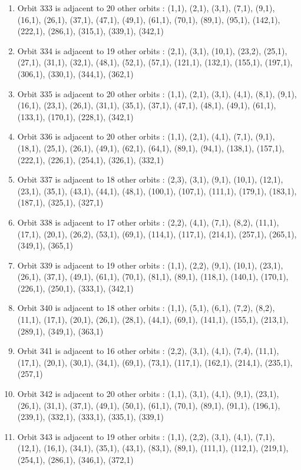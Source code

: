 \documentclass[12pt]{article}
\begin{document}
\begin{enumerate}
\item Orbit 333 is adjacent to 20 other orbits : (1,1), (2,1), (3,1), (7,1), (9,1), (16,1), (26,1), (37,1), (47,1), (49,1), (61,1), (70,1), (89,1), (95,1), (142,1), (222,1), (286,1), (315,1), (339,1), (342,1)
\item Orbit 334 is adjacent to 19 other orbits : (2,1), (3,1), (10,1), (23,2), (25,1), (27,1), (31,1), (32,1), (48,1), (52,1), (57,1), (121,1), (132,1), (155,1), (197,1), (306,1), (330,1), (344,1), (362,1)
\item Orbit 335 is adjacent to 20 other orbits : (1,1), (2,1), (3,1), (4,1), (8,1), (9,1), (16,1), (23,1), (26,1), (31,1), (35,1), (37,1), (47,1), (48,1), (49,1), (61,1), (133,1), (170,1), (228,1), (342,1)
\item Orbit 336 is adjacent to 20 other orbits : (1,1), (2,1), (4,1), (7,1), (9,1), (18,1), (25,1), (26,1), (49,1), (62,1), (64,1), (89,1), (94,1), (138,1), (157,1), (222,1), (226,1), (254,1), (326,1), (332,1)
\item Orbit 337 is adjacent to 18 other orbits : (2,3), (3,1), (9,1), (10,1), (12,1), (23,1), (35,1), (43,1), (44,1), (48,1), (100,1), (107,1), (111,1), (179,1), (183,1), (187,1), (325,1), (327,1)
\item Orbit 338 is adjacent to 17 other orbits : (2,2), (4,1), (7,1), (8,2), (11,1), (17,1), (20,1), (26,2), (53,1), (69,1), (114,1), (117,1), (214,1), (257,1), (265,1), (349,1), (365,1)
\item Orbit 339 is adjacent to 19 other orbits : (1,1), (2,2), (9,1), (10,1), (23,1), (26,1), (37,1), (49,1), (61,1), (70,1), (81,1), (89,1), (118,1), (140,1), (170,1), (226,1), (250,1), (333,1), (342,1)
\item Orbit 340 is adjacent to 18 other orbits : (1,1), (5,1), (6,1), (7,2), (8,2), (11,1), (17,1), (20,1), (26,1), (28,1), (44,1), (69,1), (141,1), (155,1), (213,1), (289,1), (349,1), (363,1)
\item Orbit 341 is adjacent to 16 other orbits : (2,2), (3,1), (4,1), (7,4), (11,1), (17,1), (20,1), (30,1), (34,1), (69,1), (73,1), (117,1), (162,1), (214,1), (235,1), (257,1)
\item Orbit 342 is adjacent to 20 other orbits : (1,1), (3,1), (4,1), (9,1), (23,1), (26,1), (31,1), (37,1), (49,1), (50,1), (61,1), (70,1), (89,1), (91,1), (196,1), (239,1), (332,1), (333,1), (335,1), (339,1)
\item Orbit 343 is adjacent to 19 other orbits : (1,1), (2,2), (3,1), (4,1), (7,1), (12,1), (16,1), (34,1), (35,1), (43,1), (83,1), (89,1), (111,1), (112,1), (219,1), (254,1), (286,1), (346,1), (372,1)

\end{enumerate}
\end{document}
